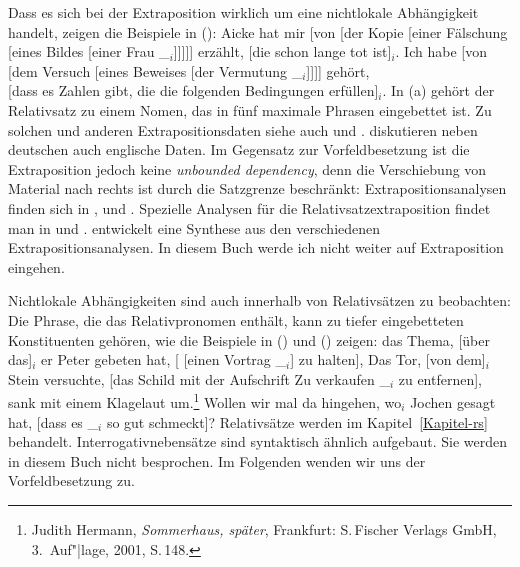 Dass es sich bei der Extraposition wirklich um eine nichtlokale Abhängigkeit handelt,
zeigen die Beispiele in ():
\eal
\ex Aicke hat mir [von [der Kopie [einer Fälschung [eines Bildes [einer Frau \_$_i$]]]]] erzählt,
    [die schon lange tot ist]$_i$.
\ex Ich habe [von [dem Versuch [eines Beweises [der Vermutung \_$_i$]]]] gehört,\\
       {}[dass es Zahlen gibt, die die folgenden Bedingungen erfüllen]$_i$.
\zl
In (a) gehört der Relativsatz zu einem Nomen, das in fünf maximale Phrasen eingebettet
ist. Zu solchen und anderen Extrapositionsdaten siehe auch 
und \textcites{Mueller2004d,Mueller2007c}[Abschnitt~13.1.5.1]{MuellerGT-Eng5}. \citet[Abschnitt~3.3]{SS2013b-u} diskutieren
neben deutschen auch englische Daten. Im Gegensatz zur
Vorfeldbesetzung ist die Extraposition jedoch keine \emph{unbounded dependency}, denn die
Verschiebung von Material nach rechts ist durch die Satzgrenze beschränkt:
\eal
{}
\zl
Extrapositionsanalysen finden sich in ,  und
. Spezielle Analysen für die Relativsatzextraposition findet man in
 und . \citet{Crysmann2013a} entwickelt eine Synthese aus den
verschiedenen Extrapositionsanalysen. In diesem Buch werde ich nicht weiter auf Extraposition
eingehen.

Nichtlokale Abhängigkeiten sind auch innerhalb von Relativsätzen zu beobachten: Die Phrase, die
das Relativpronomen enthält, kann zu tiefer eingebetteten Konstituenten gehören, wie die
Beispiele in () und () zeigen:
\eal
\label{bsp-nla-rs}
\ex{}
das Thema, [über das]$_i$ er Peter gebeten hat, [ [einen Vortrag \_$_i$] zu halten],
\ex{} 
Das Tor, [von dem]$_i$ Stein versuchte, [das Schild mit der Aufschrift \frqq Zu verkaufen\flqq{} \_$_i$ zu entfernen], sank mit einem
Klagelaut um.\footnote{
  Judith Hermann, \emph{Sommerhaus, später}, Frankfurt: S.\,Fischer Verlags GmbH, 3.\, Auf"|lage, 2001, S.\,148.%
}
\zl
\ea
Wollen wir mal da hingehen, wo$_i$ Jochen gesagt hat, [dass es \_$_i$ so gut schmeckt]?
\z{}
Relativsätze werden im Kapitel~\ref{Kapitel-rs} behandelt. Interrogativnebensätze sind syntaktisch ähnlich aufgebaut.
Sie werden in diesem Buch nicht besprochen. Im Folgenden wenden wir uns der Vorfeldbesetzung
zu.



